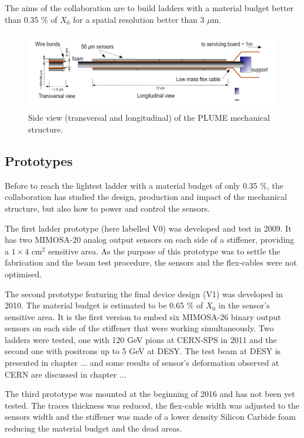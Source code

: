     The aims of the collaboration are to build ladders with a material budget better than 0.35 \% of $X_0$ for a spatial resolution better than 3 $\mu$m.

    \begin{figure}[!h]
      \centering
      \includegraphics[width = 15 cm]{Pictures/vxd/plume_finalGoal.png}
      \caption{Side view (transversal and longitudinal) of the PLUME mechanical structure.}
      \label{fig:PLUME}
    \end{figure}

    \subsection{Prototypes}

    Before to reach the lightest ladder with a material budget of only 0.35 \%, the collaboration has studied the design, production and impact of the mechanical structure, but also how to power and control the sensors.
    
    The first ladder prototype (here labelled V0) was developed and test in 2009.
    It has two MIMOSA-20 analog output sensors on each side of a stiffener, providing a $1 \times 4 \text{ cm}^2$ sensitive area.
    As the purpose of this prototype was to settle the fabrication and the beam test procedure, the sensors and the flex-cables were not optimised.
     
    The second prototype featuring the final device design (V1) was developed in 2010. 
    The material budget is estimated to be 0.65 \% of $X_0$ in the sensor's sensitive area. 
    It is the first version to embed six MIMOSA-26 binary output sensors on each side of the stiffener that were working simultaneously.
    Two ladders were tested, one with 120 GeV pions at CERN-SPS in 2011 and the second one with positrons up to 5 GeV at DESY.
    The test beam at DESY is presented in chapter ... and some results of sensor's deformation observed at CERN are discussed in chapter ...

    The third prototype was mounted at the beginning of 2016 and has not been yet tested. 
    The traces thickness was reduced, the flex-cable width was adjusted to the sensors width and the stiffener was made of a lower density Silicon Carbide foam reducing the material budget and the dead areas.

